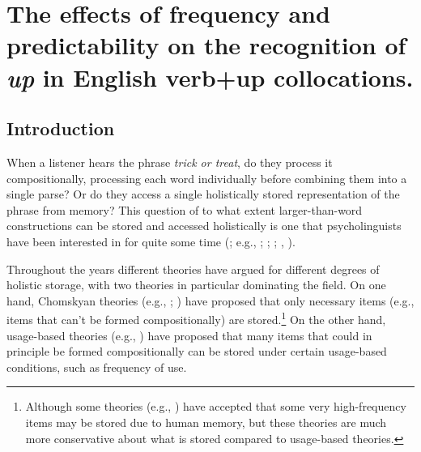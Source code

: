 \documentclass[
  12pt,
  letterpaper,
]{scrreprt}
\begin{document}

\chapter{\texorpdfstring{The effects of frequency and predictability on
the recognition of \emph{up} in English verb+up
collocations.}{The effects of frequency and predictability on the recognition of up in English verb+up collocations.}}\label{the-effects-of-frequency-and-predictability-on-the-recognition-of-up-in-english-verbup-collocations.}

\section{Introduction}\label{introduction-2}

When a listener hears the phrase \emph{trick or treat}, do they process
it compositionally, processing each word individually before combining
them into a single parse? Or do they access a single holistically stored
representation of the phrase from memory? This question of to what
extent larger-than-word constructions can be stored and accessed
holistically is one that psycholinguists have been interested in for
quite some time (; e.g.,
;
;
; ,
).

Throughout the years different theories have argued for different
degrees of holistic storage, with two theories in particular dominating
the field. On one hand, Chomskyan theories (e.g.,
;
) have proposed that
only necessary items (e.g., items that can't be formed compositionally)
are stored.\footnote{Although some theories (e.g.,
  ) have accepted that
  some very high-frequency items may be stored due to human memory, but
  these theories are much more conservative about what is stored
  compared to usage-based theories.} On the other hand, usage-based
theories (e.g., ) have proposed
that many items that could in principle be formed compositionally can be
stored under certain usage-based conditions, such as frequency of use.
\end{document}
